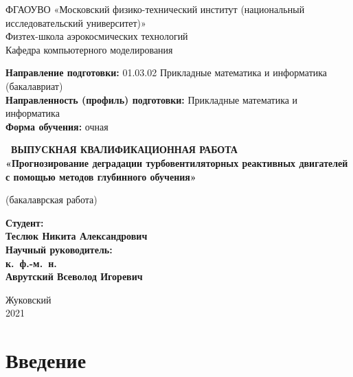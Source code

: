 \documentclass[14pt]{extarticle}
\begin{document}
\thispagestyle{empty}
\begin{center}
    \sc
        ФГАОУВО «Московский физико-технический институт \rm{(национальный исследовательский университет)}»\\
        Физтех-школа аэрокосмических технологий\\
        Кафедра компьютерного моделирования\\[20mm]
    \begin{flushleft}
  \textbf{Направление подготовки:} 01.03.02 Прикладные математика и информатика (бакалавриат) \\
  \textbf{Направленность (профиль) подготовки:} Прикладные математика и информатика \\
  \textbf{Форма обучения:} очная\\[20mm]
  
    \end{flushleft}
    
    \bf\
		ВЫПУСКНАЯ КВАЛИФИКАЦИОННАЯ РАБОТА \\ «Прогнозирование деградации турбовентиляторных реактивных двигателей с помощью методов глубинного обучения»\\

    
\end{center}
	
	\begin{center}
		(бакалаврская работа)\\[15mm]
  	\end{center}
	
		

\hfill\parbox{80mm}{
    \begin{flushleft}
    \bf
        Студент:\\
    \rm
        Теслюк Никита Александрович \\[1cm]
    \bf
        Научный руководитель:\\
    \rm
        к.~ф.-м.~н. \\ Аврутский Всеволод Игоревич \\[2cm]
    \end{flushleft}
}
\begin{center}
    Жуковский\\
    2021
\end{center}


\newpage
\tableofcontents
\newpage




\section{Введение}
\label{sec:intro}
\end{document}
